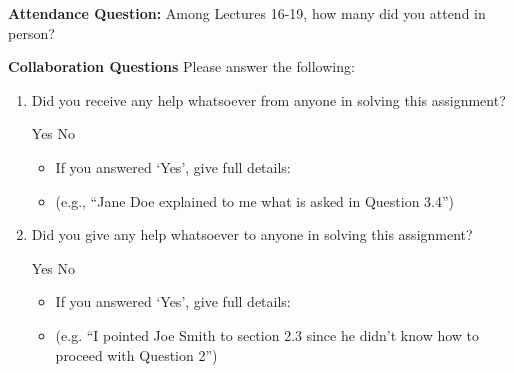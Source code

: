 \documentclass[11pt,addpoints,answers]{exam}
\numberwithin{equation}{section} %
\numberwithin{figure}{section} %
\numberwithin{table}{section} %
\begin{document}
\clearpage

\textbf{Attendance Question:} Among Lectures 16-19, how many did you attend in person?

\begin{tcolorbox}[fit,height=1cm,blank, borderline={1pt}{-2pt},nobeforeafter]
\end{tcolorbox}


    
\textbf{Collaboration Questions} Please answer the following:

\begin{enumerate}
    \item Did you receive any help whatsoever from anyone in solving this assignment?
    \begin{checkboxes}
     \choice Yes
     \choice No
    \end{checkboxes}
    \begin{itemize}
        \item If you answered `Yes', give full details:
        \item (e.g., “Jane Doe explained to me what is asked in Question 3.4”)
    \end{itemize}

    \begin{tcolorbox}[fit,height=2cm,blank, borderline={1pt}{-2pt},nobeforeafter]
    \end{tcolorbox}

    \item Did you give any help whatsoever to anyone in solving this assignment?
    \begin{checkboxes}
     \choice Yes
     \choice No
    \end{checkboxes}
    \begin{itemize}
        \item If you answered `Yes', give full details:
        \item (e.g. “I pointed Joe Smith to section 2.3 since he didn’t know how to proceed with Question 2”)
    \end{itemize}

    \begin{tcolorbox}[fit,height=2cm,blank, borderline={1pt}{-2pt},nobeforeafter]
    \end{tcolorbox}


\end{enumerate}
\end{document}
